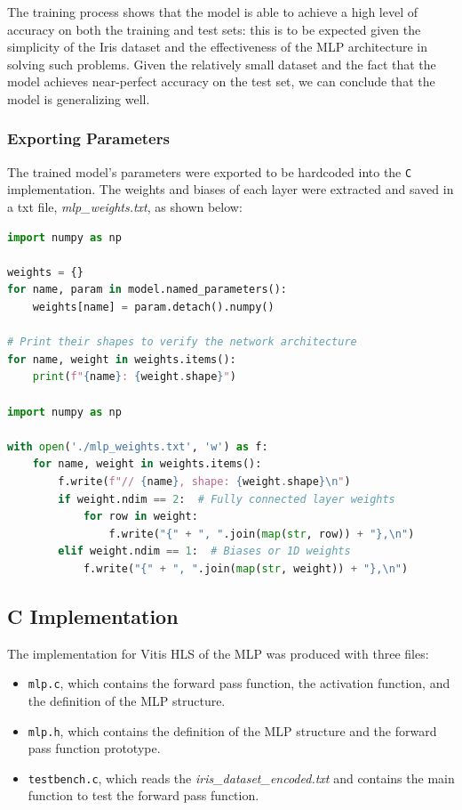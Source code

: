\documentclass{article}
\begin{document}
The training process shows that the model is able to achieve a high level of accuracy on both the training and test sets: this is to be expected given the simplicity of the Iris dataset and the effectiveness of the MLP architecture in solving such problems.
Given the relatively small dataset and the fact that the model achieves near-perfect accuracy on the test set, we can conclude that the model is generalizing well.

\subsubsection{Exporting Parameters}
\label{sec:exporting-parameters}
The trained model's parameters were exported to be hardcoded into the \texttt{C} implementation. The weights and biases of each layer were extracted and saved in a txt file, \textit{mlp\_weights.txt}, as shown below:
\begin{lstlisting}[language=Python]
import numpy as np

weights = {}
for name, param in model.named_parameters():
    weights[name] = param.detach().numpy()

# Print their shapes to verify the network architecture
for name, weight in weights.items():
    print(f"{name}: {weight.shape}")

import numpy as np

with open('./mlp_weights.txt', 'w') as f:
    for name, weight in weights.items():
        f.write(f"// {name}, shape: {weight.shape}\n")
        if weight.ndim == 2:  # Fully connected layer weights
            for row in weight:
                f.write("{" + ", ".join(map(str, row)) + "},\n")
        elif weight.ndim == 1:  # Biases or 1D weights
            f.write("{" + ", ".join(map(str, weight)) + "},\n")
\end{lstlisting}

\subsection{C Implementation}

The implementation for Vitis HLS of the MLP was produced with three files:
\begin{itemize}
    \item \texttt{mlp.c}, which contains the forward pass function, the activation function, and the definition of the MLP structure.
    \item \texttt{mlp.h}, which contains the definition of the MLP structure and the forward pass function prototype.
    \item \texttt{testbench.c}, which reads the \textit{iris\_dataset\_encoded.txt}  and contains the main function to test the forward pass function.
\end{itemize}
\end{document}
